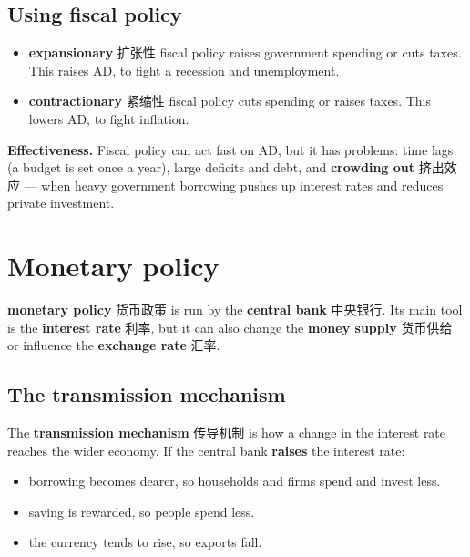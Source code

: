 \documentclass[11pt]{article}
\begin{document}
\subsection*{Using fiscal policy}

\begin{itemize}
\item \textbf{expansionary} 扩张性 fiscal policy raises government spending or cuts taxes. This raises AD, to fight a recession and unemployment.

\item \textbf{contractionary} 紧缩性 fiscal policy cuts spending or raises taxes. This lowers AD, to fight inflation.

\end{itemize}

\textbf{Effectiveness.} Fiscal policy can act fast on AD, but it has problems: time lags (a budget is set once a year), large deficits and debt, and \textbf{crowding out} 挤出效应 — when heavy government borrowing pushes up interest rates and reduces private investment.

\section*{Monetary policy}

\textbf{monetary policy} 货币政策 is run by the \textbf{central bank} 中央银行. Its main tool is the \textbf{interest rate} 利率, but it can also change the \textbf{money supply} 货币供给 or influence the \textbf{exchange rate} 汇率.

\subsection*{The transmission mechanism}

The \textbf{transmission mechanism} 传导机制 is how a change in the interest rate reaches the wider economy. If the central bank \textbf{raises} the interest rate:

\begin{itemize}
\item borrowing becomes dearer, so households and firms spend and invest less.

\item saving is rewarded, so people spend less.

\item the currency tends to rise, so exports fall.

\end{itemize}
\end{document}
